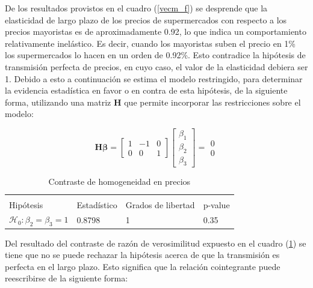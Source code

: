 De los resultados provistos en el cuadro (\ref{vecm_f}) se desprende que la elasticidad de largo plazo de los precios de supermercados con respecto a los precios mayoristas es de aproximadamente 0.92, lo que indica un comportamiento relativamente inelástico. Es decir, cuando los mayoristas suben el precio en 1\% los supermercados lo hacen en un orden de 0.92\%. Esto contradice la hipótesis de transmisión perfecta de precios, en cuyo caso, el valor de la elasticidad debiera ser 1. Debido a esto a continuación se estima el modelo restringido, para determinar la evidencia estadística en favor o en contra de esta hipótesis, de la siguiente forma, utilizando una matriz $\mathbf{H}$ que permite incorporar las restricciones sobre el modelo: 

\begin{equation}
\mathbf{H}\boldsymbol{\beta} = \left[\begin{array}{ccc} 1 & -1 & 0 \\ 
                                                            0 &  0 &  1 \end{array}\right]
                                   \left[\begin{array}{c} 
                                    \beta_{1} \\ \beta_{2} \\ \beta_{3} \end{array}\right]=\begin{array}{c} 0 \\ 0 \end{array}
\end{equation}


\begin{table}[!htpb]
\centering
\begin{threeparttable}
\caption{Contraste de homogeneidad en precios \label{blrtest}}
\begin{tabular}{@{}llll@{}}
\toprule \\
Hipótesis & Estadístico & Grados de libertad & p-value \\
\midrule 
$\mathcal{H}_{0}:\beta_{2}=\beta_{3}=1$ & 0.8798 & 1 & 0.35
\\
\bottomrule
\end{tabular}
\end{threeparttable}
\end{table}

Del resultado del contraste de razón de verosimilitud expuesto en el cuadro (\ref{blrtest}) se tiene que no se puede rechazar la hipótesis acerca de que la transmisión es perfecta en el largo plazo. Esto significa que la relación cointegrante puede reescribirse de la siguiente forma: 

